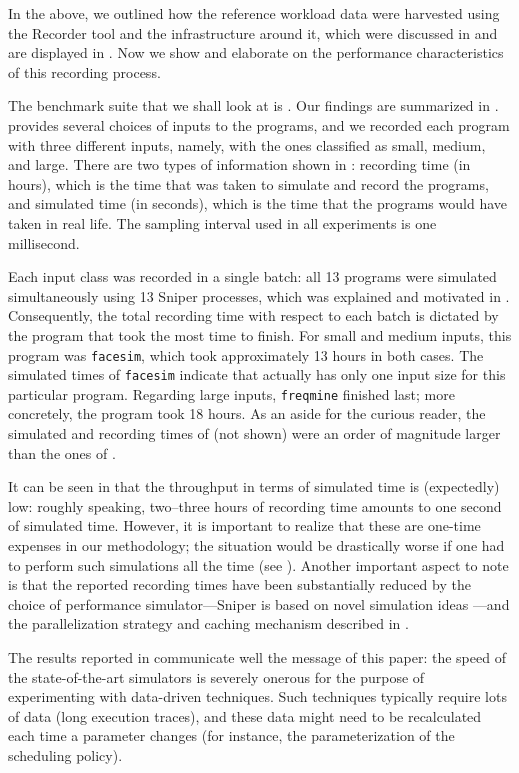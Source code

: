 
In the above, we outlined how the reference workload data were harvested using
the Recorder tool and the infrastructure around it, which were discussed in
 and are displayed in . Now we show and elaborate
on the performance characteristics of this recording process.

The benchmark suite that we shall look at is . Our findings are
summarized in .  provides several choices of inputs
to the programs, and we recorded each program with three different inputs,
namely, with the ones classified as small, medium, and large. There are two
types of information shown in : recording time (in hours), which
is the time that was taken to simulate and record the programs, and simulated
time (in seconds), which is the time that the programs would have taken in real
life. The sampling interval used in all experiments is one millisecond.

Each input class was recorded in a single batch: all 13 programs were simulated
simultaneously using 13 Sniper processes, which was explained and motivated in
. Consequently, the total recording time with respect to each
batch is dictated by the program that took the most time to finish. For small
and medium inputs, this program was \texttt{facesim}, which took approximately
13 hours in both cases. The simulated times of \texttt{facesim} indicate that
 actually has only one input size for this particular program.
Regarding large inputs, \texttt{freqmine} finished last; more concretely, the
program took 18 hours. As an aside for the curious reader, the simulated and
recording times of  (not shown) were an order of magnitude
larger than the ones of .

It can be seen in  that the throughput in terms of simulated
time is (expectedly) low: roughly speaking, two--three hours of recording time
amounts to one second of simulated time. However, it is important to realize
that these are one-time expenses in our methodology; the situation would be
drastically worse if one had to perform such simulations all the time (see
). Another important aspect to note is that the reported
recording times have been substantially reduced by the choice of performance
simulator---Sniper is based on novel simulation ideas \cite{carlson2011}---and
the parallelization strategy and caching mechanism described in .

The results reported in  communicate well the message of this
paper: the speed of the state-of-the-art simulators is severely onerous for the
purpose of experimenting with data-driven techniques. Such techniques typically
require lots of data (long execution traces), and these data might need to be
recalculated each time a parameter changes (for instance, the parameterization
of the scheduling policy).
